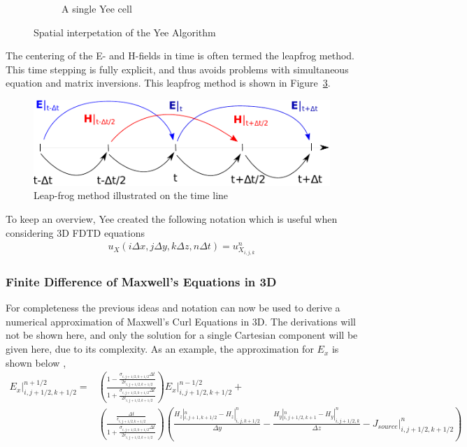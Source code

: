 \begin{figure}
\begin{subfigure}[b]{0.49\textwidth}
        \caption{A single Yee cell}
        \label{fig:yee-cell}
    \end{subfigure}
    \caption{Spatial interpetation of the Yee Algorithm}
    \label{fig:space-yee-algorithm}
\end{figure}

The centering of the E- and H-fields in time is often termed the leapfrog method. This time stepping is fully explicit, and thus avoids problems with simultaneous equation and matrix inversions. This leapfrog method is shown in Figure~\ref{fig:leap_frog}. 

\begin{figure}[htbp]
    \centering
    \includegraphics[scale=0.7]{img/analysis/leap_frog}
    \caption{Leap-frog method illustrated on the time line}
    \label{fig:leap_frog}
\end{figure}

To keep an overview, Yee created the following notation which is useful when considering 3D FDTD equations
\begin{align}
  u_X (i \Delta x , j \Delta y, k \Delta z, n \Delta t) = u^n_{X_{i,j,k}}
\end{align}

\subsubsection{Finite Difference of Maxwell's Equations in 3D}
For completeness the previous ideas and notation can now be used to derive a numerical approximation of Maxwell's Curl Equations in 3D. The derivations will not be shown here, and only the solution for a single Cartesian component will be given here, due to its complexity. As an example, the approximation for $E_x$ is shown below \cite{taflove2000computional},
\begin{align}
  E_x |^{n+1/2}_{i,j+1/2,k+1/2} =& \left( \frac{1-\frac{\sigma_{i,j+1/2,k+1/2} \Delta t}{2\epsilon_{i,j+1/2,k+1/2}}}{1+\frac{\sigma_{i,j+1/2,k+1/2} \Delta t}{2\epsilon_{i,j+1/2,k+1/2}}} \right) E_x |^{n-1/2}_{i,j+1/2,k+1/2}  + \\ 
  &\left(  \frac{\frac{\Delta t}{\epsilon_{i,j+1/2,k+1/2}}}{1+\frac{\sigma_{i,j+1/2,k+1/2} \Delta t}{2\epsilon_{i,j+1/2,k+1/2}} }    \right) \left( \frac{H_z |^n_{i,j+1,k+1/2} - H_z |^n_{i,j,k+1/2} }{\Delta y} - \frac{H_y |^n_{i,j+1/2,k+1} - H_y |^n_{i,j+1/2,k} }{\Delta z} -J_{source}|^n_{i,j+1/2,k+1/2}  \right)
\end{align}

